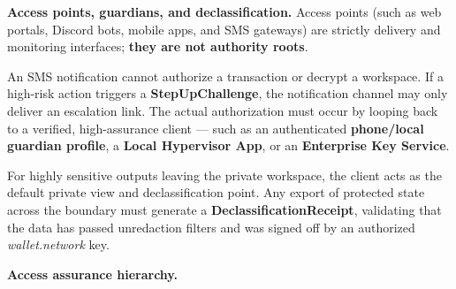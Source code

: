 \documentclass[
  11pt,
]{article}
\begin{document}
\textbf{Access points, guardians, and declassification.} Access points
(such as web portals, Discord bots, mobile apps, and SMS gateways) are
strictly delivery and monitoring interfaces; \textbf{they are not
authority roots}.

An SMS notification cannot authorize a transaction or decrypt a
workspace. If a high-risk action triggers a \textbf{StepUpChallenge},
the notification channel may only deliver an escalation link. The actual
authorization must occur by looping back to a verified, high-assurance
client --- such as an authenticated \textbf{phone/local guardian profile}, a
\textbf{Local Hypervisor App}, or an \textbf{Enterprise Key Service}.

For highly sensitive outputs leaving the private workspace, the client
acts as the default private view and declassification point. Any export
of protected state across the boundary must generate a
\textbf{DeclassificationReceipt}, validating that the data has passed
unredaction filters and was signed off by an authorized
\emph{wallet.network} key.

\textbf{Access assurance hierarchy.}
\end{document}
